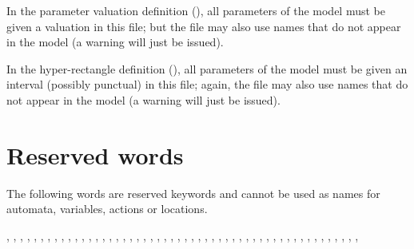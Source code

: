 

\begin{remark}
	In the parameter valuation definition (), all parameters of the model must be given a valuation in this file; but the file may also use names that do not appear in the model (a warning will just be issued).
\end{remark}

\begin{remark}
	In the hyper-rectangle definition (), all parameters of the model must be given an interval (possibly punctual) in this file; again, the file may also use names that do not appear in the model (a warning will just be issued).
\end{remark}





\section{Reserved words}

The following words are reserved keywords and cannot be used as names for automata, variables, actions or locations.

,
,
,
,
,
,
,
,
,
,
,
,
,
,
,
,
,
,
,
,
,
,
,
,
,
,
,
,
,
,
,
,
,
,
,
,
,
,
,
,
,
,
,
,
,
,
,
,
,
,
,
,







